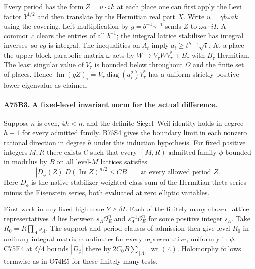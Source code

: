 Every period has the form $Z=u\cdot iI$: at each place one can first
apply the Levi factor $Y^{1/2}$ and then translate by the Hermitian
real part $X$. Write $u=\gamma b\omega ak$ using the covering.
Left multiplication by $g=b^{-1}\gamma^{-1}$ sends $Z$ to
$\omega a\cdot iI$. A common $c$ clears the entries of all $b^{-1}$;
the integral lattice stabilizer has integral inverses, so $cg$ is
integral. The inequalities on $A_t$ imply
$a_i\ge t^{h-i}\sqrt t$. At a place the upper-block parabolic matrix
$\omega$ acts by $W\mapsto V_\tau W V_\tau^*+B_\tau$ with
$B_\tau$ Hermitian. The least singular value of $V_\tau$ is bounded
below throughout $\Omega$ and the finite set of places. Hence
$\operatorname{Im}(gZ)_\tau=V_\tau\operatorname{diag}(a_i^2)V_\tau^*$
has a uniform strictly positive lower eigenvalue as claimed.

\paragraph{A75B3. A fixed-level invariant norm for the actual difference.}
Suppose $n$ is even, $4h<n$, and the definite Siegel--Weil identity
holds in degree $h-1$ for every admitted family. B75S4 gives the
boundary limit in each nonzero rational direction in degree $h$
under this induction hypothesis. For fixed positive integers $M,R$ there exists
$C$ such that every $(M,R)$-admitted family $\phi$ bounded in modulus
by $B$ on all level-$M$ lattices satisfies
\[
  |D_\phi(Z)|D(\operatorname{Im}Z)^{n/2}\le CB
  \qquad\text{at every allowed period }Z.
\]
Here $D_\phi$ is the native stabilizer-weighted class sum of the
Hermitian theta series minus the Eisenstein series, both evaluated
at zero elliptic variables.

First work in any fixed high cone $Y\ge\delta I$. Each of the finitely
many chosen lattice representatives $\Lambda$ lies between
$s_\Lambda\mathcal O_E^n$ and $s_\Lambda^{-1}\mathcal O_E^n$ for
some positive integer $s_\Lambda$. Take $R_0=R\prod_\Lambda s_\Lambda$.
The support and period clauses of admission then give level $R_0$
in ordinary integral matrix coordinates for every representative,
uniformly in $\phi$. C75E4 at $\delta/4$ bounds $|D_\phi|$ there by
$2C_0 B\sum_{[\Lambda]}\operatorname{wt}(\Lambda)$. Holomorphy
follows termwise as in O74E5 for these finitely many tests.

